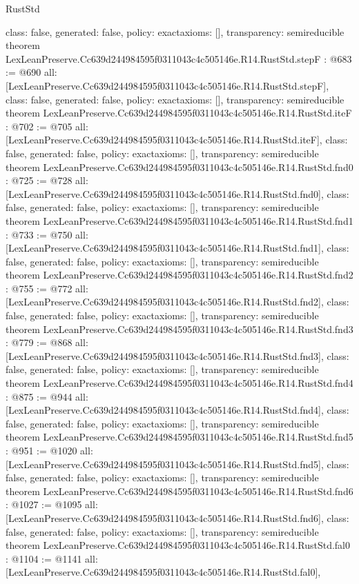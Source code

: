\begin{lexlean}{RustStd}
\begin{coremodule}
{  class: false,
  generated: false,
  policy: exact{axioms: []},
  transparency: semireducible
}
theorem LexLeanPreserve.Cc639d244984595f0311043c4c505146e.R14.RustStd.stepF : @683 := @690 {
  all: [LexLeanPreserve.Cc639d244984595f0311043c4c505146e.R14.RustStd.stepF],
  class: false,
  generated: false,
  policy: exact{axioms: []},
  transparency: semireducible
}
theorem LexLeanPreserve.Cc639d244984595f0311043c4c505146e.R14.RustStd.iteF : @702 := @705 {
  all: [LexLeanPreserve.Cc639d244984595f0311043c4c505146e.R14.RustStd.iteF],
  class: false,
  generated: false,
  policy: exact{axioms: []},
  transparency: semireducible
}
theorem LexLeanPreserve.Cc639d244984595f0311043c4c505146e.R14.RustStd.fnd0 : @725 := @728 {
  all: [LexLeanPreserve.Cc639d244984595f0311043c4c505146e.R14.RustStd.fnd0],
  class: false,
  generated: false,
  policy: exact{axioms: []},
  transparency: semireducible
}
theorem LexLeanPreserve.Cc639d244984595f0311043c4c505146e.R14.RustStd.fnd1 : @733 := @750 {
  all: [LexLeanPreserve.Cc639d244984595f0311043c4c505146e.R14.RustStd.fnd1],
  class: false,
  generated: false,
  policy: exact{axioms: []},
  transparency: semireducible
}
theorem LexLeanPreserve.Cc639d244984595f0311043c4c505146e.R14.RustStd.fnd2 : @755 := @772 {
  all: [LexLeanPreserve.Cc639d244984595f0311043c4c505146e.R14.RustStd.fnd2],
  class: false,
  generated: false,
  policy: exact{axioms: []},
  transparency: semireducible
}
theorem LexLeanPreserve.Cc639d244984595f0311043c4c505146e.R14.RustStd.fnd3 : @779 := @868 {
  all: [LexLeanPreserve.Cc639d244984595f0311043c4c505146e.R14.RustStd.fnd3],
  class: false,
  generated: false,
  policy: exact{axioms: []},
  transparency: semireducible
}
theorem LexLeanPreserve.Cc639d244984595f0311043c4c505146e.R14.RustStd.fnd4 : @875 := @944 {
  all: [LexLeanPreserve.Cc639d244984595f0311043c4c505146e.R14.RustStd.fnd4],
  class: false,
  generated: false,
  policy: exact{axioms: []},
  transparency: semireducible
}
theorem LexLeanPreserve.Cc639d244984595f0311043c4c505146e.R14.RustStd.fnd5 : @951 := @1020 {
  all: [LexLeanPreserve.Cc639d244984595f0311043c4c505146e.R14.RustStd.fnd5],
  class: false,
  generated: false,
  policy: exact{axioms: []},
  transparency: semireducible
}
theorem LexLeanPreserve.Cc639d244984595f0311043c4c505146e.R14.RustStd.fnd6 : @1027 := @1095 {
  all: [LexLeanPreserve.Cc639d244984595f0311043c4c505146e.R14.RustStd.fnd6],
  class: false,
  generated: false,
  policy: exact{axioms: []},
  transparency: semireducible
}
theorem LexLeanPreserve.Cc639d244984595f0311043c4c505146e.R14.RustStd.fal0 : @1104 := @1141 {
  all: [LexLeanPreserve.Cc639d244984595f0311043c4c505146e.R14.RustStd.fal0],
}
\end{coremodule}
\end{lexlean}
